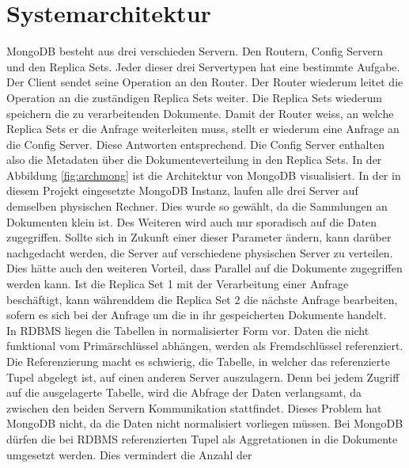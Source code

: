  \section{Systemarchitektur}
 MongoDB besteht aus drei verschieden Servern. Den Routern, Config Servern und
 den Replica Sets. Jeder dieser drei Servertypen hat eine bestimmte Aufgabe.
 Der Client sendet seine Operation an den Router. Der Router wiederum leitet
 die Operation an die zuständigen Replica Sets weiter. Die Replica Sets wiederum 
 speichern die zu verarbeitenden Dokumente. Damit der Router weiss, an welche
 Replica Sets er die Anfrage weiterleiten muss, stellt er wiederum eine Anfrage
 an die Config Server. Diese Antworten entsprechend. Die Config Server enthalten 
 also die Metadaten über die Dokumenteverteilung in den Replica Sets.
 In der Abbildung \ref{fig:archmong} ist die Architektur von MongoDB
 visualisiert.
 In der in diesem Projekt eingesetzte MongoDB Instanz, laufen alle drei Server
 auf demselben physischen Rechner. Dies wurde so gewählt, da die Sammlungen an
 Dokumenten klein ist. Des Weiteren wird auch nur sporadisch auf die Daten
 zugegriffen. Sollte sich in Zukunft einer dieser Parameter ändern, kann darüber
 nachgedacht werden, die Server auf verschiedene physischen Server zu
 verteilen. Dies hätte auch den weiteren Vorteil, dass Parallel auf die
 Dokumente zugegriffen werden kann. Ist die Replica Set 1 mit der Verarbeitung
 einer Anfrage beschäftigt, kann währenddem die Replica Set 2 die nächste
 Anfrage bearbeiten, sofern es sich bei der Anfrage um die in ihr gespeicherten
 Dokumente handelt. \\
 In RDBMS liegen die Tabellen in normalisierter Form vor. Daten die nicht
 funktional vom Primärschlüssel abhängen, werden als Fremdschlüssel
 referenziert. Die Referenzierung macht es schwierig, die Tabelle, in
 welcher das referenzierte Tupel abgelegt ist, auf einen anderen Server
 auszulagern. Denn bei jedem Zugriff auf die ausgelagerte Tabelle, wird die
 Abfrage der Daten verlangsamt, da zwischen den beiden Servern Kommunikation
 stattfindet. Dieses Problem hat MongoDB nicht, da die Daten nicht normalisiert
 vorliegen müssen. Bei MongoDB dürfen die bei RDBMS referenzierten Tupel als
 Aggretationen in die Dokumente umgesetzt werden. Dies vermindert die Anzahl der
